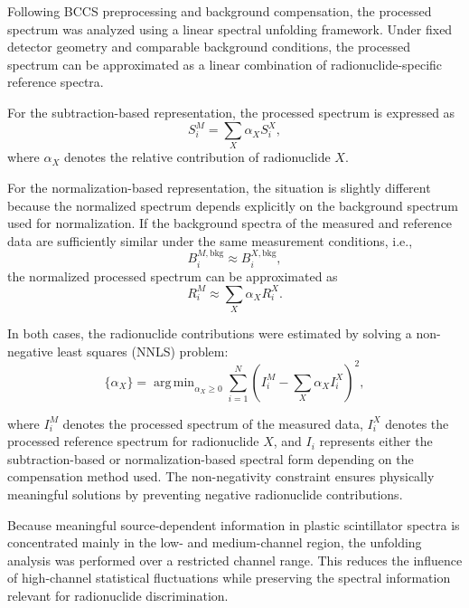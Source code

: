 \documentclass[fleqn, 10pt]{wlscirep}
\DeclareMathOperator*{\argmin}{arg\,min} %
\begin{document}
Following BCCS preprocessing and background compensation, the processed spectrum was analyzed using a linear spectral unfolding framework. Under fixed detector geometry and comparable background conditions, the processed spectrum can be approximated as a linear combination of radionuclide-specific reference spectra.

For the subtraction-based representation, the processed spectrum is expressed as
\begin{equation}
S_i^{M} = \sum_{X} \alpha_X S_i^{X},
\label{eqn:subtraction_unfolding}
\end{equation}
where $\alpha_X$ denotes the relative contribution of radionuclide $X$.

For the normalization-based representation, the situation is slightly different because the normalized spectrum depends explicitly on the background spectrum used for normalization. If the background spectra of the measured and reference data are sufficiently similar under the same measurement conditions, i.e.,
\begin{equation}
B_i^{M,\mathrm{bkg}} \approx B_i^{X,\mathrm{bkg}},
\label{eqn:bkg_similarity}
\end{equation}
the normalized processed spectrum can be approximated as
\begin{equation}
R_i^{M} \approx \sum_{X} \alpha_X R_i^{X}.
\label{eqn:ratio_unfolding}
\end{equation}

In both cases, the radionuclide contributions were estimated by solving a non-negative least squares (NNLS) problem:
\begin{equation}
\{\alpha_X\}
=
\argmin_{\alpha_X \ge 0}
\sum_{i=1}^{N}
\left(
I_i^{M} - \sum_{X}\alpha_X I_i^{X}
\right)^2,
\label{eqn:nnls}
\end{equation}

\noindent where $I_i^{M}$ denotes the processed spectrum of the measured data, $I_i^{X}$ denotes the processed reference spectrum for radionuclide $X$, and $I_i$ represents either the subtraction-based or normalization-based spectral form depending on the compensation method used. The non-negativity constraint ensures physically meaningful solutions by preventing negative radionuclide contributions.

Because meaningful source-dependent information in plastic scintillator spectra is concentrated mainly in the low- and medium-channel region, the unfolding analysis was performed over a restricted channel range. This reduces the influence of high-channel statistical fluctuations while preserving the spectral information relevant for radionuclide discrimination.
\end{document}
